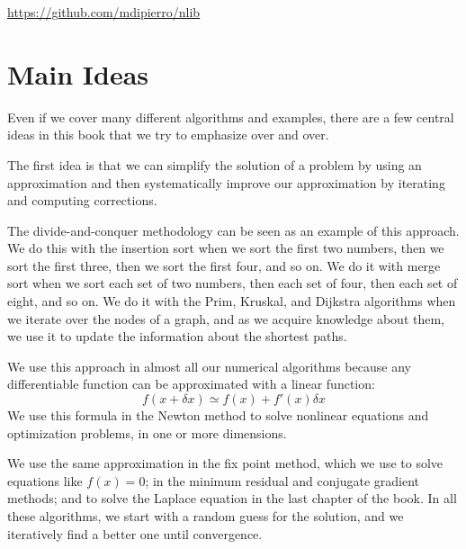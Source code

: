 \documentclass[justified,sixbynine]{tufte-book}
\theoremstyle{plain}%
\theoremstyle{definition}
\theoremstyle{remark}
\begin{document}
\begin{fullwidth}
\url{https://github.com/mdipierro/nlib}

\section{Main Ideas}

Even if we cover many different algorithms and examples, there are a few central ideas in this book that we try to emphasize over and over.

The first idea is that we can simplify the solution of a problem by using an approximation and then systematically improve our approximation by iterating and computing corrections.

The divide-and-conquer methodology can be seen as an example of this approach. We do this with the insertion sort when we sort the first two numbers, then we sort the first three, then we sort the first four, and so on. We do it with merge sort when we sort each set of two numbers, then each set of four, then each set of eight, and so on. We do it with the Prim, Kruskal, and Dijkstra algorithms when we iterate over the nodes of a graph, and as we acquire knowledge about them, we use it to update the information about the shortest paths.

We use this approach in almost all our numerical algorithms because any differentiable function can be approximated with a linear function:
\begin{equation}
f(x+\delta x) \simeq f(x) + f'(x)\delta x
\end{equation}
We use this formula in the Newton method to solve nonlinear equations and optimization problems, in one or more dimensions.

We use the same approximation in the fix point method, which we use to solve equations like $f(x)=0$; in the minimum residual and conjugate gradient methods; and to solve the Laplace equation in the last chapter of the book. In all these algorithms, we start with a random guess for the solution, and we iteratively find a better one until convergence.


\end{fullwidth}
\end{document}
